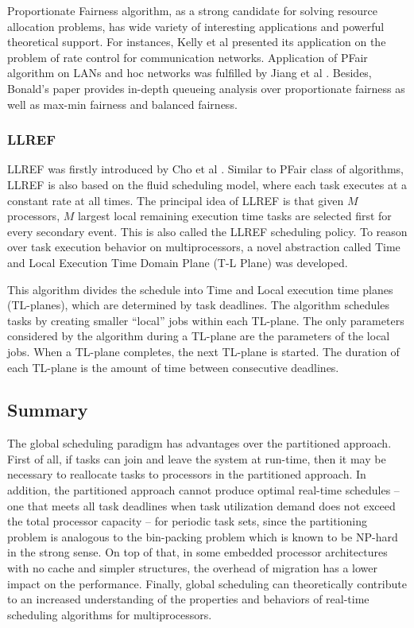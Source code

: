 \documentclass[preprint,12pt]{elsarticle}
\begin{document}
Proportionate Fairness algorithm, as a strong candidate for solving
resource allocation problems, has wide variety of interesting applications and
powerful theoretical support. 
For instances, Kelly et al \cite{kelly1998rate} presented its application on
the problem of rate control for communication networks.  
Application of PFair algorithm on LANs and hoc networks was fulfilled by Jiang
et al \cite{jiang2005proportional}. Besides, Bonald's paper
\cite{bonald2006queueing} provides in-depth queueing analysis over proportionate
fairness as well as max-min fairness and balanced fairness. 

\subsubsection{LLREF}
LLREF was firstly introduced by Cho et al \cite{cho2006optimal}. Similar to
PFair class of algorithms, LLREF is also based on the fluid scheduling model,
where each task executes at a constant rate at all times.
The principal idea of LLREF is that given $M$ processors,  $M$ largest local
remaining execution time tasks are selected first for every secondary event. 
This is also called the LLREF scheduling policy.
To reason over task execution behavior on multiprocessors, a novel abstraction
 called Time and Local Execution Time Domain Plane (T-L Plane) was developed.

 This algorithm divides the schedule into Time and Local execution time planes
 (TL-planes), which are determined by task deadlines. The algorithm schedules
 tasks by creating smaller “local” jobs within each TL-plane. The only
 parameters considered by the algorithm during a TL-plane are the parameters
 of the local jobs. When a TL-plane completes, the next TL-plane is started.
 The duration of each TL-plane is the amount of time between consecutive
 deadlines.

\subsection{Summary}
The global scheduling paradigm has advantages over the partitioned approach. 
First of all, if tasks can join and leave the system at run-time, then it may be
necessary to reallocate tasks to processors in the partitioned approach.
In addition, the partitioned approach cannot produce optimal
real-time schedules -- one that meets all task deadlines
when task utilization demand does not exceed the total processor
capacity -- for periodic task sets, since the partitioning
problem is analogous to the bin-packing problem which is known to be NP-hard
in the strong sense. 
On top of that, in some embedded processor architectures with no cache and
simpler structures, the overhead of migration has a lower
impact on the performance. 
Finally, global scheduling can theoretically contribute to an increased
understanding of the properties and behaviors of real-time scheduling
algorithms for multiprocessors.
\end{document}
